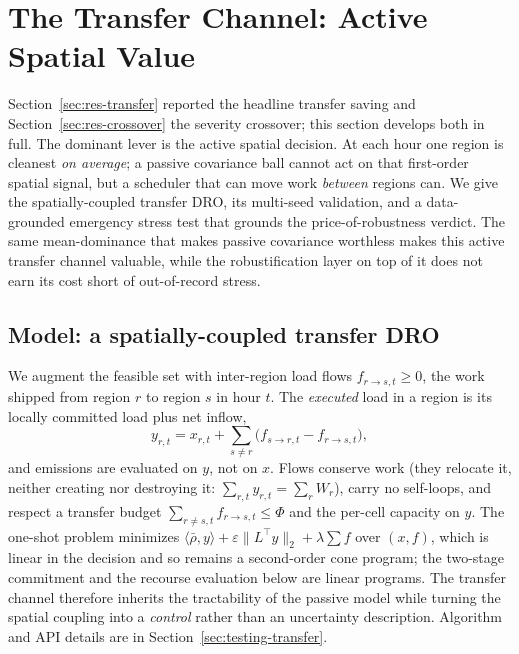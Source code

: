 \documentclass[12pt]{article}
\begin{document}
\section{The Transfer Channel: Active Spatial Value}\label{sec:transfer}
Section~\ref{sec:res-transfer} reported the headline transfer saving and
Section~\ref{sec:res-crossover} the severity crossover; this section develops both in
full. The dominant lever is the active spatial decision. At each hour one region is
cleanest \emph{on average}; a passive covariance ball cannot act on that first-order
spatial signal, but a scheduler that can move work \emph{between} regions can. We give
the spatially-coupled transfer DRO, its multi-seed validation, and a data-grounded
emergency stress test that grounds the price-of-robustness verdict. The same
mean-dominance that makes passive covariance worthless makes this active transfer
channel valuable, while the robustification layer on top of it does not earn its cost
short of out-of-record stress.

\subsection{Model: a spatially-coupled transfer DRO}\label{sec:transfer-model}
We augment the feasible set with inter-region load flows $f_{r\to s,t}\ge0$, the work
shipped from region $r$ to region $s$ in hour $t$. The \emph{executed} load in a
region is its locally committed load plus net inflow,
\begin{equation}
y_{r,t}=x_{r,t}+\sum_{s\ne r}\big(f_{s\to r,t}-f_{r\to s,t}\big),
\label{eq:executed}
\end{equation}
and emissions are evaluated on $y$, not on $x$. Flows conserve work (they relocate
it, neither creating nor destroying it: $\sum_{r,t} y_{r,t}=\sum_r W_r$), carry no
self-loops, and respect a transfer budget $\sum_{r\ne s,t} f_{r\to s,t}\le\Phi$ and
the per-cell capacity on $y$. The one-shot problem minimizes
$\langle\bar\rho,y\rangle+\varepsilon\lVert L^\top y\rVert_2+\lambda\sum f$ over
$(x,f)$, which is linear in the decision and so remains a second-order cone program;
the two-stage commitment and the recourse evaluation below are linear programs. The
transfer channel therefore inherits the tractability of the passive model while
turning the spatial coupling into a \emph{control} rather than an uncertainty
description. Algorithm and API details are in Section~\ref{sec:testing-transfer}.
\end{document}
